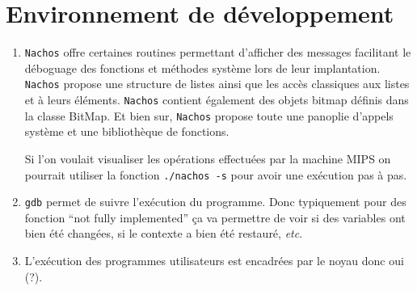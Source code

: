\documentclass{article}
\begin{document}
\section{Environnement de développement}

\begin{enumerate}
\item {\tt Nachos} offre certaines routines permettant d’afficher des messages facilitant le déboguage des fonctions et méthodes système lors de leur implantation. {\tt Nachos} propose une structure de listes ainsi que les accès classiques aux listes et à leurs éléments. {\tt Nachos} contient également des objets bitmap définis dans la classe BitMap. Et bien sur, {\tt Nachos} propose toute une panoplie d'appels système et une bibliothèque de fonctions.

Si l'on voulait visualiser les opérations effectuées par la machine MIPS on pourrait utiliser la fonction {\tt ./nachos -s} pour avoir une exécution pas à pas.
\item {\tt gdb} permet de suivre l'exécution du programme. Donc typiquement pour des fonction ``not fully implemented'' ça va permettre de voir si des variables ont bien été changées, si le contexte a bien été restauré, {\it etc}.
\item L'exécution des programmes utilisateurs est encadrées par le noyau donc oui (?).
\end{enumerate}
\end{document}
